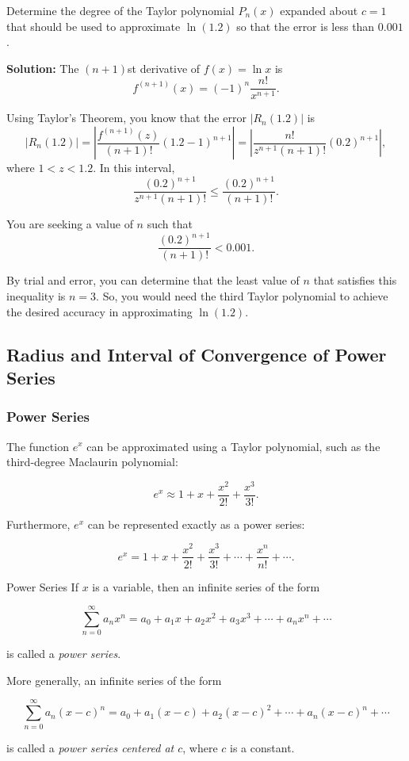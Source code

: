 \documentclass[12pt]{article}
\theoremstyle{beautifulthm}
\begin{document}
\begin{tcolorbox}[colback=examplebg, colframe=red!75!black, title=\textbf{EXAMPLE 2: Approximating a Value to a Desired Accuracy}, fonttitle=\bfseries, sharp corners]

Determine the degree of the Taylor polynomial $P_n(x)$ expanded about $c = 1$ that should be used to approximate $\ln(1.2)$ so that the error is less than $0.001$.

\tcblower
\textbf{Solution:} 
 The $(n+1)$st derivative of $f(x) = \ln x$ is
\[
f^{(n+1)}(x) = (-1)^n \frac{n!}{x^{n+1}}.
\]

Using Taylor's Theorem, you know that the error $|R_n(1.2)|$ is
\[
|R_n(1.2)| = \left| \frac{f^{(n+1)}(z)}{(n+1)!}(1.2 - 1)^{n+1} \right| = \left| \frac{n!}{z^{n+1}(n+1)!}(0.2)^{n+1} \right|,
\]
where $1 < z < 1.2$. In this interval,
\[
\frac{(0.2)^{n+1}}{z^{n+1}(n+1)!} \leq \frac{(0.2)^{n+1}}{(n+1)!}.
\]

You are seeking a value of $n$ such that 
\[
\frac{(0.2)^{n+1}}{(n+1)!} < 0.001.
\]

By trial and error, you can determine that the least value of $n$ that satisfies this inequality is $n = 3$. So, you would need the third Taylor polynomial to achieve the desired accuracy in approximating $\ln(1.2)$.
\end{tcolorbox}


\newpage
\subsection{Radius and Interval of Convergence of Power Series}

\subsubsection{Power Series}

The function $e^x$ can be approximated using a Taylor polynomial, such as the third-degree Maclaurin polynomial: 

\[
e^x \approx 1 + x + \frac{x^2}{2!} + \frac{x^3}{3!}.
\]

Furthermore, $e^x$ can be represented exactly as a power series:

\[
e^x = 1 + x + \frac{x^2}{2!} + \frac{x^3}{3!} + \cdots + \frac{x^n}{n!} + \cdots.
\]


\begin{Definition}{Power Series}{}
    If $x$ is a variable, then an infinite series of the form

\[
\sum_{n=0}^\infty a_n x^n = a_0 + a_1 x + a_2 x^2 + a_3 x^3 + \cdots + a_n x^n + \cdots
\]

is called a \textit{power series}. 

More generally, an infinite series of the form

\[
\sum_{n=0}^\infty a_n (x-c)^n = a_0 + a_1 (x-c) + a_2 (x-c)^2 + \cdots + a_n (x-c)^n + \cdots
\]

is called a \textit{power series centered at $c$}, where $c$ is a constant.
\end{Definition}
\end{document}
